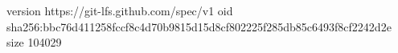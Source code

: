 version https://git-lfs.github.com/spec/v1
oid sha256:bbc76d411258fccf8c4d70b9815d15d8cf802225f285db85c6493f8cf2242d2e
size 104029
